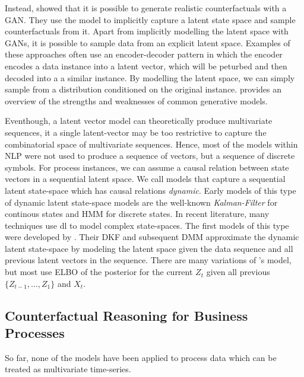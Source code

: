 \documentclass[12pt,a4paper]{report}
\begin{document}
Instead, \citeauthor{robeer_GeneratingRealisticNatural_2021} showed that it is possible to generate realistic counterfactuals with a \gls{GAN}. They use the model to implicitly capture a latent state space and sample counterfactuals from it. Apart from implicitly modelling the latent space with \glspl{GAN}, it is possible to sample data from an explicit latent space. Examples of these approaches often use an encoder-decoder pattern in which the encoder encodes a data instance into a latent vector, which will be peturbed and then decoded into a a similar instance\autocite{melnyk_ImprovedNeuralText_2017}\autocite{wang_ControllableUnsupervisedText_2019}. By modelling the latent space, we can simply sample from a distribution conditioned on the original instance. \citeauthor{bond-taylor_DeepGenerativeModelling_2021} provides an overview of the strengths and weaknesses of common generative models.

Eventhough, a latent vector model can theoretically produce multivariate sequences, it a single latent-vector may be too restrictive to capture the combinatorial space of multivariate sequences. Hence, most of the models within \gls{NLP} were not used to produce a sequence of vectors, but a sequence of discrete symbols. For process instances, we can assume a causal relation between state vectors in a sequential latent space. We call models that capture a sequential latent state-space which has causal relations \emph{dynamic}\autocite{leglaive_RecurrentVariationalAutoencoder_2020}. Early models of this type of dynamic latent state-space models are the well-known \emph{Kalman-Filter} for continous states and \gls{HMM} for discrete states. In recent literature, many techniques use \gls{dl} to model complex state-spaces. The first models of this type were developed by \citeauthor{krishnan_StructuredInferenceNetworks_2017}. Their \gls{DKF} and subsequent \gls{DMM} approximate the dynamic latent state-space by modeling the latent space given the data sequence and all previous latent vectors in the sequence. There are many variations of \citeauthor{krishnan_StructuredInferenceNetworks_2017}'s model, but most use \gls{ELBO} of the posterior for the current $Z_{t}$ given all previous $\{Z_{t-1},\ldots,Z_{1}\}$ and $X_{t}$.

\subsection{Counterfactual Reasoning for Business Processes}
So far, none of the models have been applied to process data which can be treated as multivariate time-series.
\end{document}
